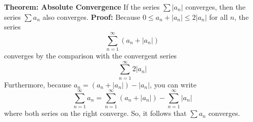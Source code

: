 \nopagenumbers
{\bf Theorem: Absolute Convergence}
\vskip 6pt
If the series $\sum|a_n|$ converges, then the series $\sum a_n$ also converges.
\vskip 10pt
{\bf Proof:}
\vskip 6pt
Because $0\leq a_n+|a_n|\leq 2|a_n|$ for all $n$, the series $$\sum_{n=1}^\infty(a_n+|a_n|)$$ converges by the comparison with the convergent series $$\sum_{n=1}^\infty 2|a_n|$$ Furthermore, because $a_n=(a_n+|a_n|)-|a_n|$, you can write $$\sum_{n=1}^\infty a_n=\sum_{n=1}^\infty(a_n+|a_n|)-\sum_{n=1}^\infty|a_n|$$ where both series on the right converge. So, it follows that $\sum a_n$ converges.



\vfill\eject
